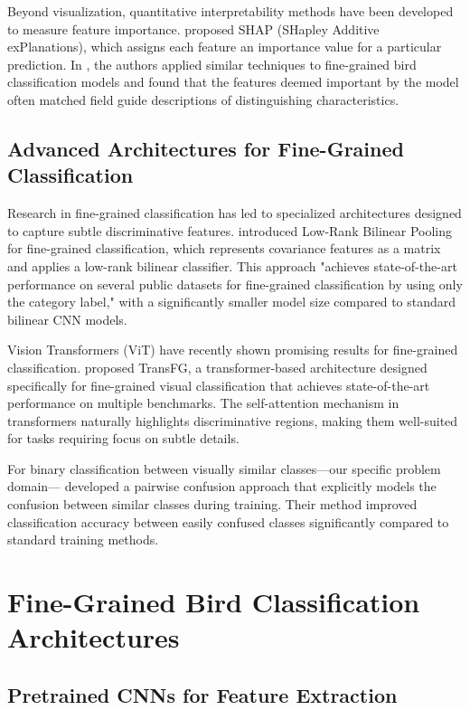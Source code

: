 Beyond visualization, quantitative interpretability methods have been developed to measure feature importance. \cite{lundberg2017unified} proposed SHAP (SHapley Additive exPlanations), which assigns each feature an importance value for a particular prediction. In \cite{zheng2019looking}, the authors applied similar techniques to fine-grained bird classification models and found that the features deemed important by the model often matched field guide descriptions of distinguishing characteristics.


\section*{Advanced Architectures for Fine-Grained Classification}

Research in fine-grained classification has led to specialized architectures designed to capture subtle discriminative features. \cite{kong2017low} introduced Low-Rank Bilinear Pooling for fine-grained classification, which represents covariance features as a matrix and applies a low-rank bilinear classifier. This approach "achieves state-of-the-art performance on several public datasets for fine-grained classification by using only the category label," with a significantly smaller model size compared to standard bilinear CNN models.


Vision Transformers (ViT) have recently shown promising results for fine-grained classification. \cite{he2022transfg} proposed TransFG, a transformer-based architecture designed specifically for fine-grained visual classification that achieves state-of-the-art performance on multiple benchmarks. The self-attention mechanism in transformers naturally highlights discriminative regions, making them well-suited for tasks requiring focus on subtle details.


For binary classification between visually similar classes—our specific problem domain—\cite{dubey2018pairwise} developed a pairwise confusion approach that explicitly models the confusion between similar classes during training. Their method improved classification accuracy between easily confused classes significantly compared to standard training methods.


\chapter*{Fine-Grained Bird Classification Architectures}

\section*{Pretrained CNNs for Feature Extraction}

